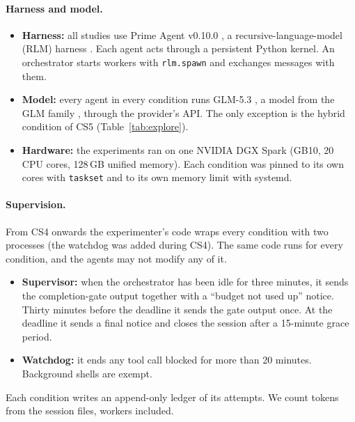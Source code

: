 \documentclass[11pt]{article}
\begin{document}
\paragraph{Harness and model.}
\begin{itemize}
  \item \textbf{Harness:} all studies use Prime Agent v0.10.0 \citep{primeagent}, a recursive-language-model (RLM)
    harness \citep{zhang2025rlm}. Each agent acts through a persistent Python kernel. An orchestrator starts workers with
    \texttt{rlm.spawn} and exchanges messages with them.
  \item \textbf{Model:} every agent in every condition runs GLM-5.3 \citep{glm53}, a model from the GLM family
    \citep{glm2025glm45}, through the provider's API. The only exception is the hybrid condition of CS5 (Table~\ref{tab:explore}).
  \item \textbf{Hardware:} the experiments ran on one NVIDIA DGX Spark (GB10, 20 CPU cores, 128\,GB unified memory).
    Each condition was pinned to its own cores with \texttt{taskset} and to its own memory limit with systemd.
\end{itemize}

\paragraph{Supervision.} From CS4 onwards the experimenter's code wraps every condition with two processes (the watchdog
was added during CS4). The same code runs for every condition, and the agents may not modify any of it.
\begin{itemize}
  \item \textbf{Supervisor:} when the orchestrator has been idle for three minutes, it sends the completion-gate output
    together with a ``budget not used up'' notice. Thirty minutes before the deadline it sends the gate output once. At
    the deadline it sends a final notice and closes the session after a 15-minute grace period.
  \item \textbf{Watchdog:} it ends any tool call blocked for more than 20 minutes. Background shells are exempt.
\end{itemize}
Each condition writes an append-only ledger of its attempts. We count tokens from the session files, workers included.
\end{document}
